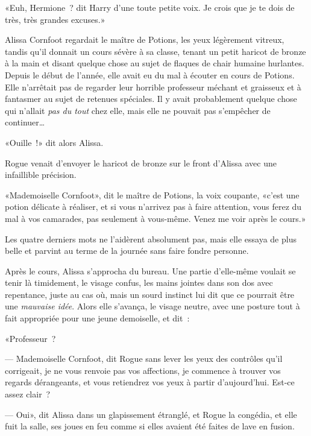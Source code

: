 
«Euh, Hermione~? dit Harry d'une toute petite voix. Je crois que je te dois de très, très grandes excuses.»


Alissa Cornfoot regardait le maître de Potions, les yeux légèrement vitreux, tandis qu'il donnait un cours sévère à sa classe, tenant un petit haricot de bronze à la main et disant quelque chose au sujet de flaques de chair humaine hurlantes. Depuis le début de l'année, elle avait eu du mal à écouter en cours de Potions. Elle n'arrêtait pas de regarder leur horrible professeur méchant et graisseux et à fantasmer au sujet de retenues spéciales. Il y avait probablement quelque chose qui n'allait \emph{pas du tout} chez elle, mais elle ne pouvait pas s'empêcher de continuer…

«Ouille~!» dit alors Alissa.

Rogue venait d'envoyer le haricot de bronze sur le front d'Alissa avec une infaillible précision.

«Mademoiselle Cornfoot», dit le maître de Potions, la voix coupante, «c'est une potion délicate à réaliser, et si vous n'arrivez pas à faire attention, vous ferez du mal à vos camarades, pas seulement à vous-même. Venez me voir après le cours.»

Les quatre derniers mots ne l'aidèrent absolument pas, mais elle essaya de plus belle et parvint au terme de la journée sans faire fondre personne.

Après le cours, Alissa s'approcha du bureau. Une partie d'elle-même voulait se tenir là timidement, le visage confus, les mains jointes dans son dos avec repentance, juste au cas où, mais un sourd instinct lui dit que ce pourrait être une \emph{mauvaise idée}. Alors elle s'avança, le visage neutre, avec une posture tout à fait appropriée pour une jeune demoiselle, et dit~:

«Professeur~?

--- Mademoiselle Cornfoot, dit Rogue sans lever les yeux des contrôles qu'il corrigeait, je ne vous renvoie pas vos affections, je commence à trouver vos regards dérangeants, et vous retiendrez vos yeux à partir d'aujourd'hui. Est-ce assez clair~?

--- Oui», dit Alissa dans un glapissement étranglé, et Rogue la congédia, et elle fuit la salle, ses joues en feu comme si elles avaient été faites de lave en fusion.

